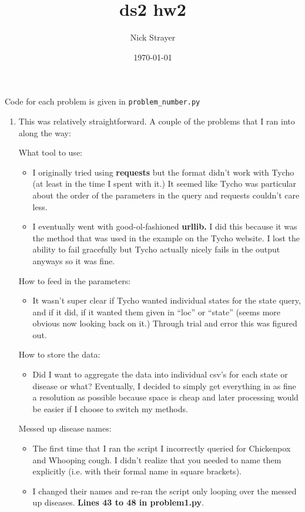\documentclass[]{article}
\begin{document}
\title{ds2 hw2}
\author{Nick Strayer}
\date{\today}
\maketitle

Code for each problem is given in \texttt{problem\_number.py}

\begin{enumerate}
\item This was relatively straightforward. A couple of the problems that I ran into along the way: 

{\large What tool to use:}
\begin{itemize}
\item I originally tried using \textbf{requests} but the format didn’t work with Tycho (at least in the time I spent with it.) It seemed like Tycho was particular about the order of the parameters in the query and requests couldn’t care less. 

\item I eventually went with good-ol-fashioned \textbf{urllib.} I did this because it was the method that was used in the example on the Tycho website. I lost the ability to fail gracefully but Tycho actually nicely fails in the output anyways so it was fine. 
\end{itemize}

{\large How to feed in the parameters: }

\begin{itemize}
\item It wasn’t super clear if Tycho wanted individual states for the state query, and if it did, if it wanted them given in “loc” or “state” (seems more obvious now looking back on it.) Through trial and error this was figured out. 
\end{itemize}

{\large How to store the data:}

\begin{itemize}
\item Did I want to aggregate the data into individual csv’s for each state or disease or what? Eventually, I decided to simply get everything in as fine a resolution as possible because space is cheap and later processing would be easier if I choose to switch my methods. 
\end{itemize}

{\large Messed up disease names:}
\begin{itemize}
\item The first time that I ran the script I incorrectly queried for Chickenpox and Whooping cough. I didn’t realize that you needed to name them explicitly (i.e. with their formal name in square brackets).
\item I changed their names and re-ran the script only looping over the messed up diseases. \textbf{Lines 43 to 48 in problem1.py}.
\end{itemize}


\end{enumerate}
\end{document}

